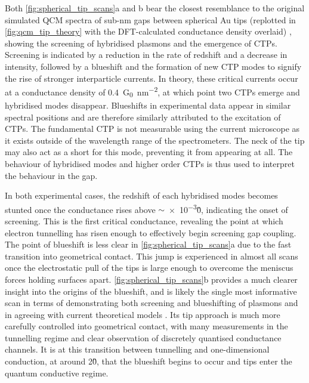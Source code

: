 \documentclass[a4paper]{article}
\begin{document}
Both \autoref{fig:spherical_tip_scans}a and b bear the closest resemblance to the original simulated QCM spectra of sub-nm gaps between spherical Au tips (replotted in \autoref{fig:qcm_tip_theory} with the DFT-calculated conductance density overlaid) \cite{savage2012}, showing the screening of hybridised plasmons and the emergence of CTPs. Screening is indicated by a reduction in the rate of redshift and a decrease in intensity, followed by a blueshift and the formation of new CTP modes to signify the rise of stronger interparticle currents. In theory, these critical currents occur at a conductance density of \SI{0.4}{G_0.nm^{-2}}, at which point two CTPs emerge and hybridised modes disappear. Blueshifts in experimental data appear in similar spectral positions and are therefore similarly attributed to the excitation of CTPs. The fundamental CTP is not measurable using the current microscope as it exists outside of the wavelength range of the spectrometers. The neck of the tip may also act as a short for this mode, preventing it from appearing at all. The behaviour of hybridised modes and higher order CTPs is thus used to interpret the behaviour in the gap.

In both experimental cases, the redshift of each hybridised modes becomes stunted once the conductance rises above $\sim$\num{e-3}\G0, indicating the onset of screening. This is the first critical conductance, revealing the point at which electron tunnelling has risen enough to effectively begin screening gap coupling. The point of blueshift is less clear in \autoref{fig:spherical_tip_scans}a due to the fast transition into geometrical contact. This jump is experienced in almost all scans once the electrostatic pull of the tips is large enough to overcome the meniscus forces holding surfaces apart. \autoref{fig:spherical_tip_scans}b provides a much clearer insight into the origins of the blueshift, and is likely the single most informative scan in terms of demonstrating both screening and blueshifting of plasmons and in agreeing with current theoretical models \cite{zuloaga2009, savage2012}. Its tip approach is much more carefully controlled into geometrical contact, with many measurements in the tunnelling regime and clear observation of discretely quantised conductance channels. It is at this transition between tunnelling and one-dimensional conduction, at around 2\G0, that the blueshift begins to occur and tips enter the quantum conductive regime.
\end{document}
